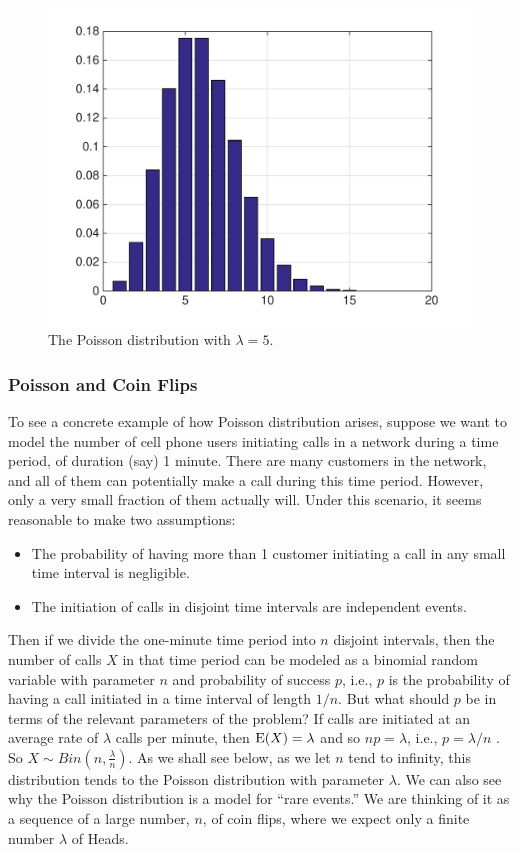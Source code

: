 \documentclass[11pt]{article}
\def\Ex#1{{\rm E}(#1)}
\begin{document}
\begin{figure}[h!]
\centering
\includegraphics[scale=0.35]{poisson}
\caption{The Poisson distribution with $\lambda = 5$.}
\label{fig:poisson}
\end{figure}



\subsubsection*{Poisson and Coin Flips}

To see a concrete example of how Poisson distribution arises, suppose we want to model the number of cell phone
users initiating calls in
a network during a time period, of duration (say) 1 minute. There are many customers in the network,
and all of them can potentially make a call during this time period. However, only a very small fraction of
them actually will. Under this scenario, it seems reasonable to make two assumptions:
\begin{itemize}
\item The probability of having more than 1 customer initiating a call in any small time interval is negligible.
\item The initiation of calls in disjoint time intervals are independent events.
\end{itemize}
Then if we divide the one-minute time period into $n$ disjoint intervals, then the number of calls $X$ in that
time period can be modeled as a binomial random variable with parameter $n$ and probability of success $p$, i.e., $p$ is the
probability of having a call initiated in a time interval of length $1/n$. But what should $p$ be in terms of
the relevant parameters of the problem? If calls are initiated at an average rate of $\lambda$ calls per minute, then
$\Ex{X} = \lambda$ and so $np = \lambda$, i.e., $p = \lambda/n$ . So $X \sim Bin(n,\frac{\lambda}{n})$. As we shall see
below, as we let $n$ tend to infinity, this distribution tends to the Poisson distribution with parameter $\lambda$.
We can also see why the Poisson distribution is a model for ``rare events.'' We are thinking of it as a sequence of 
a large number, $n$, of coin flips, where we expect only a finite number $\lambda$ of Heads. 
\end{document}
